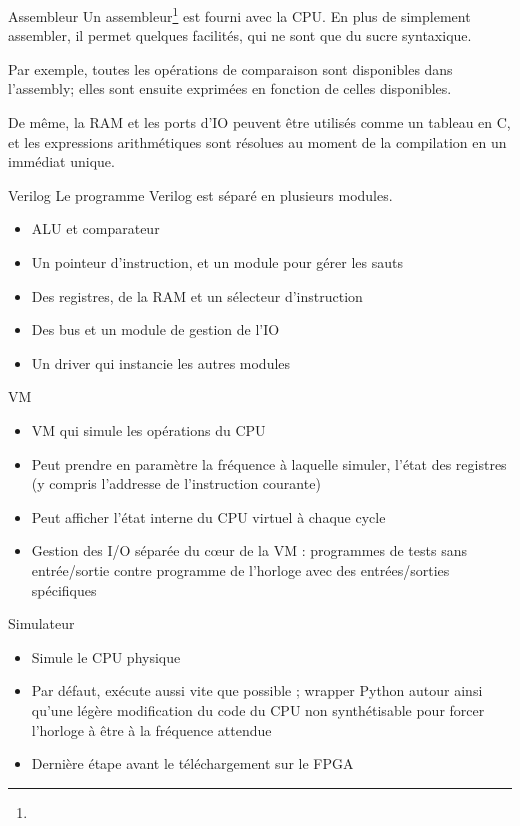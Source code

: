 \documentclass{beamer}
\begin{document}
\begin{frame}{Assembleur}
  Un assembleur\footnote{} est fourni avec la CPU. En plus
  de simplement assembler, il permet quelques facilités, qui ne sont
  que du sucre syntaxique.\par
  \pause
  Par exemple, toutes les opérations de comparaison sont disponibles
  dans l'assembly; elles sont ensuite exprimées en fonction de celles
  disponibles.\par
  \pause
  De même, la RAM et les ports d'IO peuvent être utilisés comme un
  tableau en C, et les expressions arithmétiques sont résolues au
  moment de la compilation en un immédiat unique.
\end{frame}

\begin{frame}{Verilog}
    Le programme Verilog est séparé en plusieurs modules.
    \begin{itemize}
        \item ALU et comparateur
        \item Un pointeur d'instruction, et un module pour gérer les sauts
        \item Des registres, de la RAM et un sélecteur d'instruction
        \item Des bus et un module de gestion de l'IO
        \item Un driver qui instancie les autres modules
    \end{itemize}
\end{frame}

\begin{frame}{VM}
    \begin{itemize}
        \item VM qui simule les opérations du CPU
        \item Peut prendre en paramètre la fréquence à laquelle simuler, l'état des registres (y compris l'addresse de l'instruction courante)
        \item Peut afficher l'état interne du CPU virtuel à chaque cycle
        \item Gestion des I/O séparée du c\oe{}ur de la VM : programmes de tests sans entrée/sortie contre programme de l'horloge avec des entrées/sorties spécifiques
    \end{itemize}
\end{frame}

\begin{frame}{Simulateur}
    \begin{itemize}
        \item Simule le CPU physique
        \item Par défaut, exécute aussi vite que possible ; wrapper Python autour ainsi qu'une légère modification du code du CPU non synthétisable pour forcer l'horloge à être à la fréquence attendue
        \item Dernière étape avant le téléchargement sur le FPGA
    \end{itemize}
\end{frame}
\end{document}
